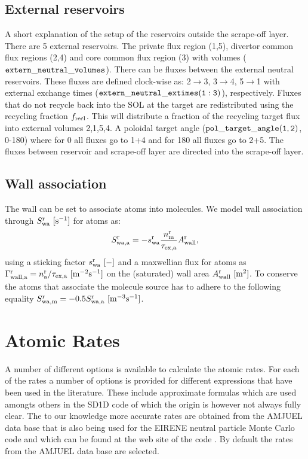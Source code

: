 \documentclass[amsmath,amssymb,a4]{revtex4-2}
\begin{document}
\subsection{External reservoirs}
A short explanation of the setup of the reservoirs outside the scrape-off layer. There are 5 external reservoirs. The private flux region (1,5), divertor common flux regions (2,4) and core common flux region (3) with volumes ($\tt extern\_neutral\_volumes$). There can be fluxes between the external neutral reservoirs. These fluxes are defined clock-wise as: 2$\rightarrow$3, 3$\rightarrow$4,  5$\rightarrow$1 with external exchange times ($\tt extern\_neutral\_extimes(1:3)$), respectively. Fluxes that do not recycle back into the SOL at the target are redistributed using the recycling fraction $f_{\rm recl}$. This will distribute a fraction of the recycling target flux into external volumes 2,1,5,4. A poloidal target angle ($\tt pol\_target\_angle(1,2)$, 0-180) where for 0 all fluxes go to 1+4 and for 180 all fluxes go to 2+5. The fluxes between reservoir and scrape-off layer are directed into the scrape-off layer.

\subsection{Wall association}
The wall can be set to associate atoms into molecules.
We model wall association through $ S^{\rm r}_{\rm wa}~\mathrm{[s^{-1}]}$ for atoms as:
\begin{equation} \label{eq: wall association source}
 { S^{\rm r}_{\rm wa,a}}  = - s^{\rm r}_{\rm wa}  \frac{n_{\rm m}^{\rm r}}{\tau_{\rm ex,a}}  A^{\rm r}_{\rm wall}, 
\end{equation}
using a sticking factor $s^{\rm r}_{\rm wa}~ \mathrm{[-]}$ and a maxwellian flux for atoms as $\Gamma^{\rm r}_{\rm wall,a}={n_{\rm a}^{\rm r}}/{\tau_{\rm ex,a}}~\mathrm{[m^{-2} s^{-1}]}$ on the (saturated) wall area $A^{\rm r}_{\rm wall}~\mathrm{[m^2]}$. To conserve the atoms that associate the molecule source has to adhere to the following equality $ S^{\rm r}_{\rm wa,m} = -0.5 S^{\rm r}_{\rm wa,a}~\mathrm{[m^{-3} s^{-1}]}$. 
 

\section{Atomic Rates}\label{rates}

A number of different options is available to calculate the atomic rates. For each of the rates a number of options is provided for different expressions that have been used in the literature. These include approximate formulas which are used amongts others in the SD1D code \cite{SD1D} of which the origin is however not always fully clear. The to our knowledge more accurate rates are obtained from the AMJUEL data base that is also being used for the EIRENE neutral particle Monte Carlo code and which can be found at the web site of the code \cite{EIRENE}. By default the rates from the AMJUEL data base are selected.
\end{document}
